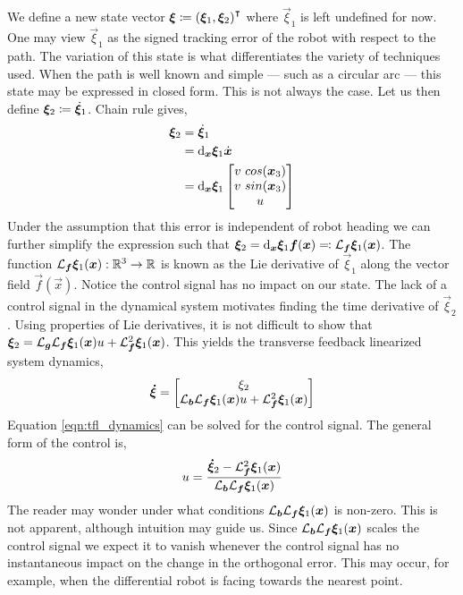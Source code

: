 \documentclass[oneside, 11pt]{book}
\begin{document}
We define a new state vector $\bm{\xi} \coloneqq {(\bm{\xi}_1, \bm{\xi}_2)}^{\intercal}$ where $\vec{\xi}_1$ is left undefined for now. One may view $\vec{\xi}_1$ as the signed tracking error of the robot with respect to the path. The variation of this state is what differentiates the variety of techniques used. When the path is well known and simple --- such as a circular arc --- this state may be expressed in closed form. This is not always the case. Let us then define $\bm{\xi}_2 \coloneqq \dot{\bm{\xi}}_1$. Chain rule gives,
\begin{align*}
    \bm{\xi}_2     &=  \dot{\bm{\xi}}_1\\
                    &=  \mathop{}\!\mathrm{d}_{\bm{x}}\bm{\xi}_1 \dot{\bm{x}}\\
                    &=  \mathop{}\!\mathrm{d}_{\bm{x}}\bm{\xi}_1
                        \begin{bmatrix}
                            v~cos(\bm{x}_3)\\
                            v~sin(\bm{x}_3)\\
                            u
                        \end{bmatrix}
\end{align*}
Under the assumption that this error is independent of robot heading we can further simplify the expression such that $\bm{\xi}_2=\mathop{}\!\mathrm{d}_{\bm{x}}\bm{\xi}_1 \bm{f}(\bm{x}) \eqqcolon \mathcal{L}_{\bm{f}}\bm{\xi}_1(\bm{x})$. The function $\mathcal{L}_{\bm{f}}\bm{\xi}_1(\bm{x}) : \mathbb{R}^3\to\mathbb{R}$ is known as the Lie derivative of $\vec{\xi}_1$ along the vector field $\vec{f}(\vec{x})$. Notice the control signal has no impact on our state. The lack of a control signal in the dynamical system motivates finding the time derivative of $\vec{\xi}_2$. Using properties of Lie derivatives, it is not difficult to show that $\bm{\xi}_2=\mathcal{L}_{\bm{g}}\mathcal{L}_{\bm{f}}\bm{\xi}_1(\bm{x}) u + \mathcal{L}_{\bm{f}}^2 \bm{\xi}_1(\bm{x})$. This yields the transverse feedback linearized system dynamics,
\begin{equation}
    \bm{\dot{\xi}}
    =
    \begin{bmatrix}
        \xi_2 \\
        \mathcal{L}_{\bm{b}}\mathcal{L}_{\bm{f}}\bm{\xi}_1(\bm{x}) u + \mathcal{L}_{\bm{f}}^2 \bm{\xi}_1(\bm{x})
    \end{bmatrix}
    \label{eqn:tfl_dynamics}
\end{equation}
Equation \ref{eqn:tfl_dynamics} can be solved for the control signal. The general form of the control is,
\begin{equation}
    u = \frac{ \bm{\dot{\xi}}_2 - \mathcal{L}_{\bm{f}}^2 \bm{\xi}_1(\bm{x}) }{ \mathcal{L}_{\bm{b}}\mathcal{L}_{\bm{f}}\bm{\xi}_1(\bm{x}) } \label{eqn:tfl_general_control}
\end{equation}
The reader may wonder under what conditions $\mathcal{L}_{\bm{b}}\mathcal{L}_{\bm{f}}\bm{\xi}_1(\bm{x})$ is non-zero. This is not apparent, although intuition may guide us. Since $\mathcal{L}_{\bm{b}}\mathcal{L}_{\bm{f}}\bm{\xi}_1(\bm{x})$ scales the control signal we expect it to vanish whenever the control signal has no instantaneous impact on the change in the orthogonal error. This may occur, for example, when the differential robot is facing towards the nearest point.
\end{document}
